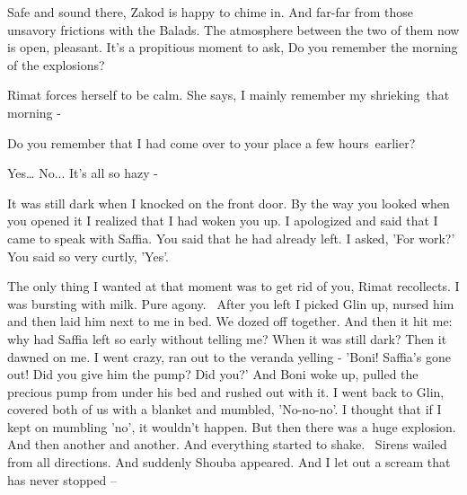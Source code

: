 \documentclass[letterpaper]{article}
\begin{document}
{\textquotedbl}Safe and sound there,{\textquotedbl} Zakod is happy to chime in. {\textquotedbl}And far-far from those
unsavory frictions with the Balads.{\textquotedbl} The atmosphere between the two of them now is open, pleasant. It's a
propitious moment to ask, {\textquotedbl}Do you remember the morning of the explosions?{\textquotedbl} 

Rimat forces herself to be calm. She says, {\textquotedbl}I mainly remember my shrieking~that morning -{\textquotedbl} 

{\textquotedbl}Do you remember that I had come over to your place a few hours~earlier?{\textquotedbl} 

{\textquotedbl}Yes{\dots} No... It's all so hazy -{\textquotedbl} 

{\textquotedbl}It was still dark when I knocked on the front door. By the way you looked when you opened it I realized
that I had woken you up. I apologized and said that I came to speak with Saffia. You said that he had already left. I
asked, 'For work?' You said so very curtly, 'Yes'.{\textquotedbl} 

{\textquotedbl}The only thing I wanted\textcolor[rgb]{0.0,0.4392157,0.7529412}{ }at that moment was to get rid of
you,{\textquotedbl} Rimat recollects. {\textquotedbl}I was bursting with milk. Pure agony. ~After you left I picked
Glin up, nursed\textcolor{red}{ }him and then laid him next to me in bed. We dozed off together. And then it hit me:
why had Saffia left so early without telling me? When it was still dark? Then it dawned\textcolor{red}{ }on me. I went
crazy, ran out to the veranda yelling - 'Boni! Saffia's gone out! Did you give him the pump? Did you?' And Boni woke
up, pulled the precious pump from under his bed and rushed out with it. I went back to Glin, covered both of us with a
blanket and mumbled, 'No-no-no'. I thought that if I kept on mumbling 'no', it wouldn't happen. But then there was a
huge explosion. And then another and another. And everything started to shake. \ Sirens wailed from all directions. And
suddenly Shouba appeared. And I let out a scream that has never stopped --{\textquotedbl}
\end{document}
